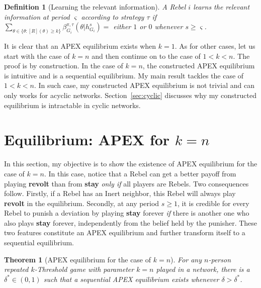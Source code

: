 \documentclass[12pt,letter]{article}
\newtheorem{theorem}{Theorem}
\newtheorem{definition}{Definition}[section]
\theoremstyle{definition}
\theoremstyle{definition}
\theoremstyle{remark}
\theoremstyle{claim}
\begin{document}
\begin{definition}[Learning the relevant information]\label{def_learn}
A Rebel $i$ learns the relevant information at period $\varsigma$ according to strategy $\tau$ if $\sum_{\theta\in\{\theta:[R](\theta)\geq k\}}\beta^{\pi,\tau}_{G_i}(\theta|h^{s}_{G_i})=$ either $1$ or $0$ whenever $s\geq \varsigma$.
\end{definition}

It is clear that an APEX equilibrium exists when $k=1$. As for other cases, let us start with the case of $k=n$ and then continue on to the case of $1<k<n$. The proof is by construction. In the case of $k=n$, the constructed APEX equilibrium is intuitive and is a sequential equilibrium. My main result tackles the case of $1<k<n$. In such case, my constructed APEX equilibrium is not trivial and can only works for acyclic networks. Section~\ref{sec:cyclic} discusses why my constructed equilibrium is intractable in cyclic networks.

\section{Equilibrium: APEX for $k=n$}
\label{sec:equilibrium_1}

In this section, my objective is to show the existence of APEX equilibrium for the case of $k=n$. In this case, notice that a Rebel can get a better payoff from playing \textbf{revolt} than from \textbf{stay} \textit{only if} all players are Rebels. Two consequences follow. Firstly, if a Rebel has an Inert neighbor, this Rebel will always play \textbf{revolt} in the equilibrium. Secondly, at any period $s\geq 1$, it is credible for every Rebel to punish a deviation by playing \textbf{stay} forever \textit{if} there is another one who also plays \textbf{stay} forever, independently from the belief held by the punisher. These two features constitute an APEX equilibrium and further transform itself to a sequential equilibrium. 

\begin{theorem}[APEX equilibrium for the case of $k=n$]
\label{thm_minor_thm}
For any $n$-person repeated $k$-Threshold game with parameter $k=n$ played in a network, there is a $\delta^{*}\in(0,1)$ such that a sequential APEX equilibrium exists whenever $\delta >
\delta^{*}$.
\end{theorem}
\end{document}
